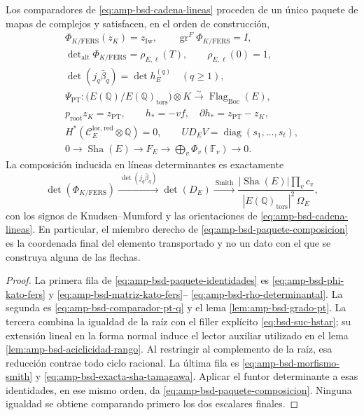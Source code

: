 \begin{proposition}
\label{prop:amp-bsd-paquete-comparadores-exacto}
Los comparadores de
\eqref{eq:amp-bsd-cadena-lineas} proceden de un único paquete de mapas de
complejos y satisfacen, en el orden de construcción,
\begin{equation}\label{eq:amp-bsd-paquete-identidades}
 \begin{gathered}
 \Phi_{K/\mathrm{FERS}}(z_K)=z_{\mathrm{Iw}},\qquad
 \operatorname{gr}^{F}\Phi_{K/\mathrm{FERS}}=I,\\
 \det\nolimits_{\mathrm{alt}}\Phi_{K/\mathrm{FERS}}
   =\rho_{E,\ell}(T),\qquad \rho_{E,\ell}(0)=1,\\
 \det(j_q\bar\beta_q)=\det h_E^{(q)}\quad(q\geq1),\\
 \Psi_{\mathrm{PT}}:
  \bigl(E(\mathbb Q)/E(\mathbb Q)_{\mathrm{tors}}\bigr)\otimes K
  \xrightarrow{\sim}\operatorname{Flag}_{\mathrm{Boc}}(E),\\
 p_{\mathrm{root}}z_K=z_{\mathrm{PT}},\qquad
 h_*=-vf,\quad \partial h_*=z_{\mathrm{PT}}-z_K,\\
 H^*(\mathcal C_E^{\mathrm{loc,red}}\otimes\mathbb Q)=0,\qquad
 U D_E V=\operatorname{diag}(s_1,\ldots,s_t),\\
 0\longrightarrow\operatorname{Sha}(E)
  \longrightarrow F_E
  \longrightarrow\displaystyle\bigoplus_v\Phi_v(\mathbb F_v)
  \longrightarrow0 .
 \end{gathered}
\end{equation}
La composición inducida en líneas determinantes es exactamente
\begin{equation}\label{eq:amp-bsd-paquete-composicion}
 \det(\Phi_{K/\mathrm{FERS}})
 \xrightarrow{\ \det(j_q\bar\beta_q)\ }
 \det(D_E)
 \xrightarrow{\ \mathrm{Smith}\ }
 \frac{|\operatorname{Sha}(E)|\prod_vc_v}
      {|E(\mathbb Q)_{\mathrm{tors}}|^2\,\Omega_E},
\end{equation}
con los signos de Knudsen--Mumford y las orientaciones de
\eqref{eq:amp-bsd-cadena-lineas}. En particular, el miembro derecho de
\eqref{eq:amp-bsd-paquete-composicion} es la coordenada final del elemento
transportado y no un dato con el que se construya alguna de las flechas.
\end{proposition}

\begin{proof}
La primera fila de \eqref{eq:amp-bsd-paquete-identidades} es
\eqref{eq:amp-bsd-phi-kato-fers} y
\eqref{eq:amp-bsd-matriz-kato-fers}--
\eqref{eq:amp-bsd-rho-determinantal}. La segunda es
\eqref{eq:amp-bsd-comparador-pt-q} y el lema
\ref{lem:amp-bsd-grado-pt}. La tercera combina la igualdad de la raíz con
el filler explícito \eqref{eq:bsd-suc-hstar}; su extensión lineal en la
forma normal induce el lector auxiliar utilizado en el lema
\ref{lem:amp-bsd-aciclicidad-rango}. Al restringir al complemento de la
raíz, esa reducción contrae todo ciclo racional. La última fila es
\eqref{eq:amp-bsd-morfismo-smith} y
\eqref{eq:amp-bsd-exacta-sha-tamagawa}. Aplicar el funtor determinante a
esas identidades, en ese mismo orden, da
\eqref{eq:amp-bsd-paquete-composicion}. Ninguna igualdad se obtiene
comparando primero los dos escalares finales.
\end{proof}

